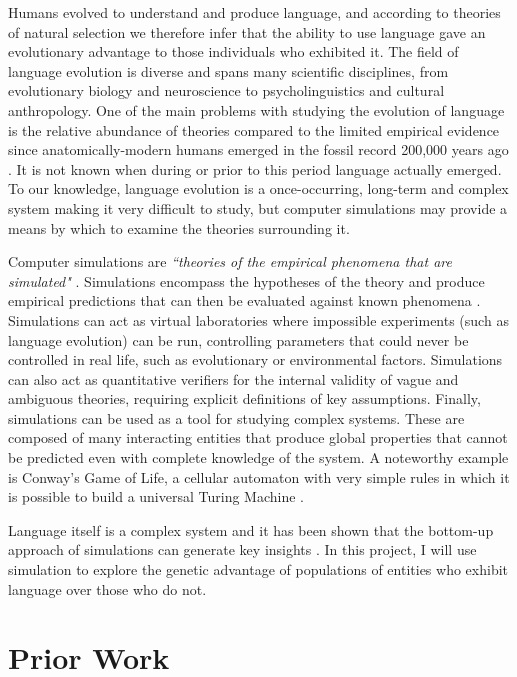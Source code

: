 \documentclass[12pt,a4paper]{report}
\begin{document}
Humans evolved to understand and produce language, and according to theories of natural selection we therefore infer that the ability to use language gave an evolutionary advantage to those individuals who exhibited it. The field of language evolution is diverse and spans many scientific disciplines, from evolutionary biology and neuroscience to psycholinguistics and cultural anthropology. One of the main problems with studying the evolution of language is the relative abundance of theories compared to the limited empirical evidence since anatomically-modern humans emerged in the fossil record 200,000 years ago \citep{Fleagle2008}. It is not known when during or prior to this period language actually emerged. To our knowledge, language evolution is a once-occurring, long-term and complex system making it very difficult to study, but computer simulations may provide a means by which to examine the theories surrounding it.

Computer simulations are \emph{``theories of the empirical phenomena that are simulated"} \citep{cangelosi2012simulating}. Simulations encompass the hypotheses of the theory and produce empirical predictions that can then be evaluated against known phenomena \citep{cavalli1997genes}. Simulations can act as virtual laboratories where impossible experiments (such as language evolution) can be run, controlling parameters that could never be controlled in real life, such as evolutionary or environmental factors. Simulations can also act as quantitative verifiers for the internal validity of vague and ambiguous theories, requiring explicit definitions of key assumptions. Finally, simulations can be used as a tool for studying complex systems. These are composed of many interacting entities that produce global properties that cannot be predicted even with complete knowledge of the system. A noteworthy example is Conway's Game of Life, a cellular automaton with very simple rules in which it is possible to build a universal Turing Machine \citep{rendell2002turing}.

Language itself is a complex system and it has been shown that the bottom-up approach of simulations can generate key insights \citep{langton1997artificial}. In this project, I will use simulation to explore the genetic advantage of populations of entities who exhibit language over those who do not.

\section{Prior Work}
\end{document}
